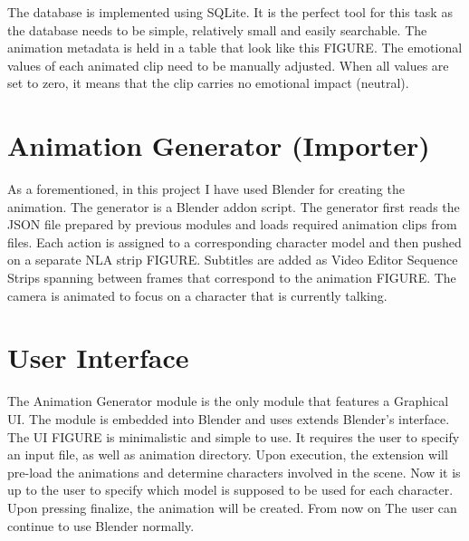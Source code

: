 The database is implemented using SQLite. It is the perfect tool for this task as the database needs to be simple, relatively small and easily searchable. The animation metadata is held in a table that look like this FIGURE. The emotional values of each animated clip need to be manually adjusted. When all values are set to zero, it means that the clip carries no emotional impact (neutral).


\section{Animation Generator (Importer)}


As a forementioned, in this project I have used Blender for creating the animation. The generator is a Blender addon script. The generator first reads the JSON file prepared by previous modules and loads required animation clips from files. Each action is assigned to a corresponding character model and then pushed on a separate NLA strip FIGURE. Subtitles are added as Video Editor Sequence Strips spanning between frames that correspond to the animation FIGURE. The camera is animated to focus on a character that is currently talking.



\section{User Interface}

The Animation Generator module is the only module that features a Graphical UI. The module is embedded into Blender and uses extends Blender's interface. The UI FIGURE is minimalistic and simple to use. It requires the user to specify an input file, as well as animation directory. Upon execution, the extension will pre-load the animations and determine characters involved in the scene. Now it is up to the user to specify which model is supposed to be used for each character. Upon pressing finalize, the animation will be created. From now on The user can continue to use Blender normally.





